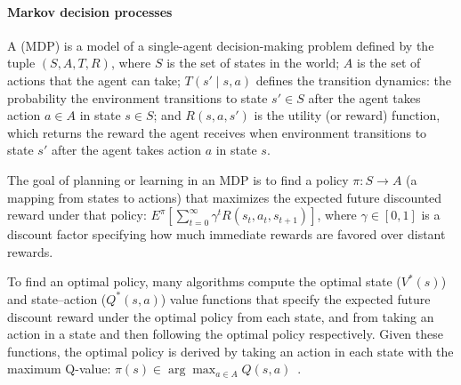 
\vspace{\up}
\paragraph{Markov decision processes}

A  (MDP) is a model of a single-agent
decision-making problem defined by the tuple $(S, A, T, R)$, where
$S$ is the set of states in the world; $A$ is the set of actions that
the agent can take; $T(s' \mid s, a)$ defines the transition dynamics:
the probability the environment transitions to state $s' \in S$
after the agent takes action $a \in A$ in state $s \in S$; and 
$R(s, a, s')$ is the utility (or reward) function, which returns the reward the
agent receives when environment transitions to state $s'$ after the
agent takes action $a$ in state $s$.

The goal of planning or learning in an MDP is to find a policy $\pi :
S \rightarrow A$ (a mapping from states to actions) that maximizes the
expected future discounted reward under that policy: $E^{\pi} \left[
  \sum_{t=0}^\infty \gamma^t R(s_t, a_t, s_{t+1}) \right]$, where
$\gamma \in [0, 1]$ is a discount factor specifying how much immediate
rewards are favored over distant rewards. 

To find an optimal policy, many algorithms compute the optimal state
($V^*(s)$) and state--action ($Q^*(s,a)$) value functions that specify
the expected future discount reward under the optimal policy from each
state, and from taking an action in a state and then following the
optimal policy respectively. 
Given these functions, the optimal policy is derived by taking an
action in each state with the maximum Q-value: 
$\pi(s) \in \arg\max_{a \in A} Q(s, a)$~\cite{bertsekas87}.

